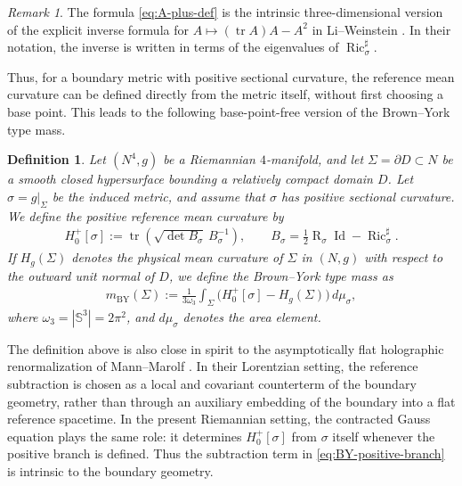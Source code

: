 \documentclass[10pt]{amsart}
\newcommand{\Sph}{\mathbb{S}}
\newcommand{\tr}{\operatorname{tr}}
\newcommand{\Ric}{\operatorname{Ric}}
\newcommand{\Id}{\operatorname{Id}}
\newcommand{\Scal}{\operatorname{R}}
\newcommand{\BY}{\mathrm{BY}}
\theoremstyle{plain}
\newtheorem{definition}[theorem]{Definition}
\theoremstyle{remark}
\newtheorem{remark}[theorem]{Remark}
\begin{document}
	\begin{remark}
		The formula \eqref{eq:A-plus-def} is the intrinsic three-dimensional
		version of the explicit inverse formula for
		$A\mapsto(\tr A)A-A^2$ in Li--Weinstein \cite{LiWeinstein}. In their
		notation, the inverse is written in terms of the eigenvalues of
		$\Ric_\sigma^\sharp$.
	\end{remark}
	
	\medskip
	
	Thus, for a boundary metric with positive sectional curvature, the reference mean
	curvature can be defined directly from the metric itself, without first choosing
	a base point. This leads to the following base-point-free version of the
	Brown--York type mass.
	
	\begin{definition}
		Let $(N^4,g)$ be a Riemannian $4$-manifold, and let
		$\Sigma=\partial D\subset N$ be a smooth closed hypersurface bounding a
		relatively compact domain $D$. Let $\sigma=g|_\Sigma$ be the induced metric,
		and assume that $\sigma$ has positive sectional curvature. We define the
		positive reference mean curvature by
		\begin{align}
			H_0^+[\sigma]
			:=
			\tr
			\left(
			\sqrt{\det B_\sigma}\,B_\sigma^{-1}
			\right),
			\qquad
			B_\sigma
			=
			\frac12\Scal_\sigma\Id-\Ric_\sigma^\sharp.
		\end{align}
		If $H_g(\Sigma)$ denotes the physical mean curvature of $\Sigma$ in $(N,g)$ with
		respect to the outward unit normal of $D$, we define the Brown--York type mass as
		\begin{align}\label{eq:BY-positive-branch}
			m_{\BY}(\Sigma)
			:=
			\frac{1}{3\omega_3}
			\int_\Sigma
			\bigl(
			H_0^+[\sigma]-H_g(\Sigma)
			\bigr)\,d\mu_\sigma,
		\end{align}
		where $\omega_3=|\Sph^3|=2\pi^2$, and $d\mu_\sigma$ denotes the area element.
	\end{definition}
	
	The definition above is also close in spirit to the asymptotically flat
	holographic renormalization of Mann--Marolf \cite{MannMarolf}. In their
	Lorentzian setting, the reference subtraction is chosen as a local and covariant
	counterterm of the boundary geometry, rather than through an auxiliary embedding
	of the boundary into a flat reference spacetime. In the present Riemannian setting, the contracted Gauss equation plays the
	same role: it determines $H_0^+[\sigma]$ from $\sigma$ itself whenever the positive
	branch is defined. Thus the subtraction term in
	\eqref{eq:BY-positive-branch} is intrinsic to the boundary geometry.
	
\end{document}
